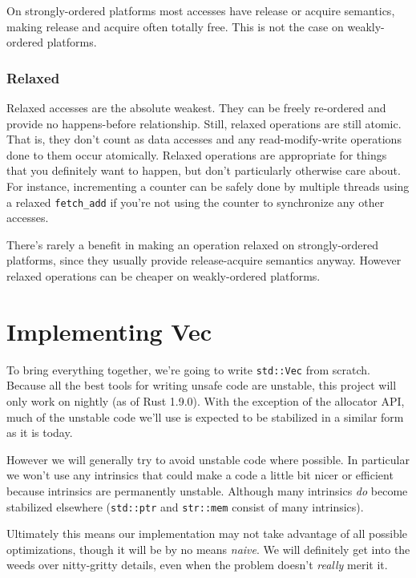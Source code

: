 \documentclass[a4paper,]{book}
\begin{document}
On strongly-ordered platforms most accesses have release or acquire
semantics, making release and acquire often totally free. This is not
the case on weakly-ordered platforms.

\subsection{Relaxed}\label{relaxed}

Relaxed accesses are the absolute weakest. They can be freely re-ordered
and provide no happens-before relationship. Still, relaxed operations
are still atomic. That is, they don't count as data accesses and any
read-modify-write operations done to them occur atomically. Relaxed
operations are appropriate for things that you definitely want to
happen, but don't particularly otherwise care about. For instance,
incrementing a counter can be safely done by multiple threads using a
relaxed \texttt{fetch\_add} if you're not using the counter to
synchronize any other accesses.

There's rarely a benefit in making an operation relaxed on
strongly-ordered platforms, since they usually provide release-acquire
semantics anyway. However relaxed operations can be cheaper on
weakly-ordered platforms.

\chapter{Implementing Vec}\label{sec--vec}

To bring everything together, we're going to write \texttt{std::Vec}
from scratch. Because all the best tools for writing unsafe code are
unstable, this project will only work on nightly (as of Rust 1.9.0).
With the exception of the allocator API, much of the unstable code we'll
use is expected to be stabilized in a similar form as it is today.

However we will generally try to avoid unstable code where possible. In
particular we won't use any intrinsics that could make a code a little
bit nicer or efficient because intrinsics are permanently unstable.
Although many intrinsics \emph{do} become stabilized elsewhere
(\texttt{std::ptr} and \texttt{str::mem} consist of many intrinsics).

Ultimately this means our implementation may not take advantage of all
possible optimizations, though it will be by no means \emph{naive}. We
will definitely get into the weeds over nitty-gritty details, even when
the problem doesn't \emph{really} merit it.
\end{document}
